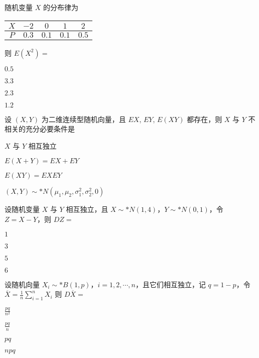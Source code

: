 \documentclass{exam-zh}
\begin{document}
\begin{question}
  随机变量 $X$ 的分布律为

  \begin{table}[H]
    \centering
    \begin{tabular}{|c|c|c|c|c|}
    \hline
    $X$ & $-2$ & $0$ & $1$ & $2$ \\
    \hline
    $P$ & $0.3$ & $0.1$ & $0.1$ & $0.5$ \\
    \hline
    \end{tabular}
  \end{table}

  则 $E(X^2) =$ \paren[B]
  \begin{choices}
    \item $0.5$
    \item $3.3$
    \item $2.3$
    \item $1.2$
  \end{choices}
\end{question}

\begin{question}
  设 $(X, Y)$ 为二维连续型随机向量，且 $EX$, $EY$, $E(XY)$ 都存在，则 $X$ 与 $Y$ 不相关的充分必要条件是 \paren[C]
  \begin{choices}
    \item $X$ 与 $Y$ 相互独立
    \item $E(X + Y) = EX + EY$
    \item $E(XY) = EXEY$
    \item $(X, Y) \sim* N(\mu_1, \mu_2, \sigma_1^2, \sigma_2^2, 0)$
  \end{choices}
\end{question}

\begin{question}
  设随机变量 $X$ 与 $Y$ 相互独立，且 $X \sim* N(1,4)$，$Y \sim* N(0,1)$，令 $Z = X - Y$，则 $DZ =$ \paren[C]
  \begin{choices}
    \item $1$
    \item $3$
    \item $5$
    \item $6$
  \end{choices}
\end{question}

\begin{question}
  设随机向量 $X_i \sim* B(1,p)$，$i=1,2,\cdots,n$，且它们相互独立，记 $q=1-p$，令
  $\overline{X} = \frac{1}{n}\sum_{i=1}^{n}X_i$
  则
  $D\overline{X} = $
  \paren[B]
  \begin{choices}
    \item $\frac{pq}{n^2}$
    \item $\frac{pq}{n}$
    \item $pq$
    \item $npq$
  \end{choices}
\end{question}
\end{document}
